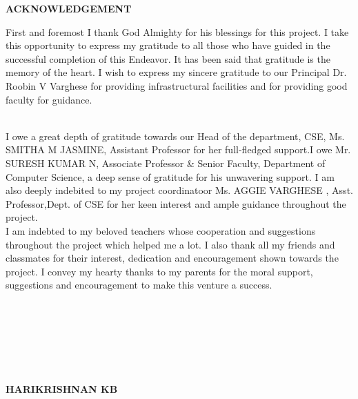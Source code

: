 	\begin{center}
		\textbf{\LARGE{ACKNOWLEDGEMENT}}\\[0.5cm]
	\end{center}
	First and foremost I thank God Almighty for his blessings for this project. I take this opportunity to express my gratitude to all those who have guided in the successful completion of this Endeavor. It has been said that gratitude is the memory of the heart. I wish to express my sincere gratitude to our Principal Dr. Roobin V Varghese for providing infrastructural facilities and for providing good faculty for guidance.\textbf{\\} \textbf{\\}
	
	I owe a great depth of gratitude towards our Head of the department, CSE, Ms. SMITHA M JASMINE,  Assistant Professor for her full-fledged support.I owe Mr. SURESH KUMAR N, Associate Professor \& Senior Faculty, Department of Computer Science, a deep sense of gratitude for his unwavering support. I am also deeply indebited to my project coordinatoor Ms. AGGIE VARGHESE ,  Asst. Professor,Dept. of CSE for her keen interest and ample guidance throughout the project.  \\

	I am indebted to my beloved teachers whose cooperation and suggestions throughout the project which helped me a lot. I also thank all my friends and classmates for their interest, dedication and encouragement shown towards the project. I convey my hearty thanks to my parents for the moral support,  suggestions and encouragement to make this venture a success.\textbf{\\}\textbf{\\}\textbf{\\}\textbf{\\}\textbf{\\}\textbf{\\}\textbf{\\}
	
	\hspace{9cm}
	\textbf{HARIKRISHNAN KB}
	

